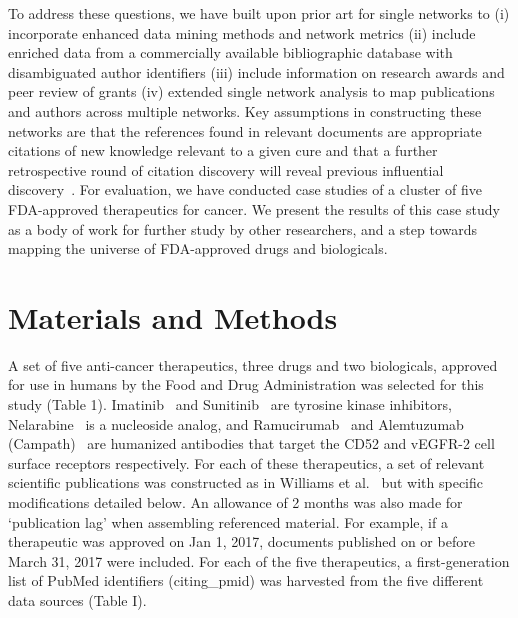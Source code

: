 \documentclass[10pt,letterpaper]{article}
\begin{document}
To address these questions, we have built upon prior art for single networks to (i) incorporate enhanced data mining methods and network metrics (ii) include enriched data from a commercially available bibliographic database with disambiguated author identifiers (iii) include information on research awards and peer review of grants (iv) extended single network analysis to map publications and authors across multiple networks. Key assumptions in constructing these networks are that the references found in relevant documents are appropriate citations of new knowledge relevant to a given cure and that a further retrospective round of citation discovery will reveal previous influential discovery~\cite{bibWilliams}. For evaluation, we have conducted case studies of a cluster of five FDA-approved therapeutics for cancer. We present the results of this case study as a body of work for further study by other researchers, and a step towards mapping the universe of FDA-approved drugs and biologicals. 

\section*{Materials and Methods}  A set of five anti-cancer therapeutics, three drugs and two biologicals, approved for use in humans by the Food and Drug Administration was selected for this study (Table 1). Imatinib~\cite{bibImatinib} and Sunitinib~\cite{bibSunitinib} are tyrosine kinase inhibitors, Nelarabine~\cite{bibNelarabine} is a nucleoside analog, and Ramucirumab~\cite{bibRamucirumab} and Alemtuzumab (Campath)~\cite{bibAlemtuzumab} are humanized antibodies that target the CD52 and vEGFR-2 cell surface receptors respectively. For each of these therapeutics, a set of relevant scientific publications was constructed as in Williams et al.~\cite{bibWilliams} but with specific modifications detailed below. An allowance of 2 months was also made for `publication lag' when assembling referenced material. For example, if a therapeutic was approved on Jan 1, 2017, documents published  on or before March 31, 2017 were included. For each of the five therapeutics, a first-generation list of PubMed identifiers (citing\_pmid) was harvested from the five different data sources (Table I). 
\end{document}
